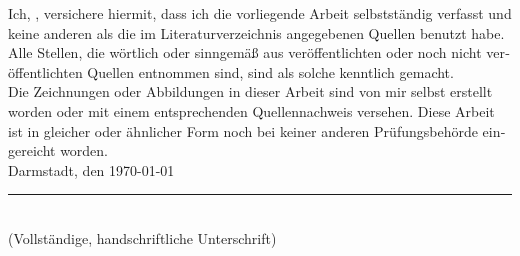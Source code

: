 \documentclass[
11pt, %
ngerman,
english,
singlespacing, %
headsepline, %
]{MastersDoctoralThesis} %
\begin{document}
\begin{otherlanguage}{ngerman}
\begin{declaration}
\addchaptertocentry{\authorshipname} %
\noindent Ich, \authorname, versichere hiermit, dass ich die vorliegende Arbeit selbstständig verfasst und keine anderen als die im Literaturverzeichnis angegebenen Quellen benutzt habe. \\ 

\noindent Alle Stellen, die wörtlich oder sinngemäß aus veröffentlichten oder noch nicht veröffentlichten Quellen entnommen sind, sind als solche kenntlich gemacht.\\

\noindent Die Zeichnungen oder Abbildungen in dieser Arbeit sind von mir selbst erstellt worden oder mit einem entsprechenden Quellennachweis versehen. Diese Arbeit ist in gleicher oder ähnlicher Form noch bei keiner anderen Prüfungsbehörde eingereicht worden.\\

\noindent Darmstadt, den \today

\vspace{5em}
\noindent\rule[1em]{25em}{0.5pt}\\ %
(Vollständige, handschriftliche Unterschrift)

\end{declaration}
\end{otherlanguage}

\end{document}
